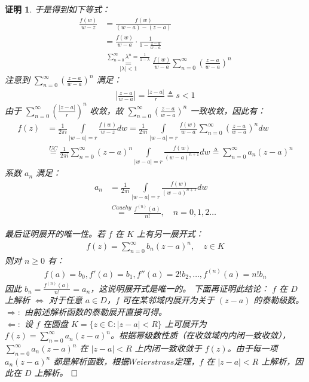 \documentclass{ctexart}
\newcommand{\。}{．} %
\newenvironment{lanse}{
    \begin{tcolorbox}[breakable,enhanced, colback=qlan, boxrule=0pt, frame hidden,
        borderline west={0.7mm}{0.1mm}{slan}]
    }
    {\end{tcolorbox}}
\theoremstyle{t} %
\newtheorem*{zmhj}{\color{slan} 证明}
\newenvironment{zm}{\begin{lanse}\begin{zmhj}}{$\hfill \square$\end{zmhj}\end{lanse}}
\begin{document}
\begin{zm}
    于是得到如下等式：
    \begin{align*}
        \frac{f(w)}{w-z}&=\frac{f(w)}{(w-a)-(z-a)}\\
        &=\frac{f(w)}{w-a}\cdot\frac{1}{1-\frac{z-a}{w-a}}\\
        &\stackrel{\sum_{n=0}^{\infty}\lambda^n=\frac{1}{1-\lambda}}{\underset{|\lambda|<1}{=}}\frac{f(w)}{w-a}\sum_{n=0}^{\infty}\left(\frac{z-a}{w-a}\right)^n
    \end{align*}
    注意到 $\sum_{n=0}^{\infty}\left(\frac{z-a}{w-a}\right)^n$ 满足：
    \begin{align*}
        \left|\frac{z-a}{w-a}\right|=\frac{|z-a|}{r}\triangleq s<1
    \end{align*}
    由于 $\sum_{n=0}^{\infty}\left(\frac{|z-a|}{r}\right)^n$ 收敛，故 $\sum_{n=0}^{\infty}\left(\frac{z-a}{w-a}\right)^n$ 一致收敛，因此有：
    \begin{align*}
        f(z)&=\frac{1}{2\pi i}\int\limits_{|w-a|=r}\frac{f(w)}{w-z}dw=\frac{1}{2\pi i}\int\limits_{|w-a|=r}\frac{f(w)}{w-a}\sum_{n=0}^{\infty}\left(\frac{z-a}{w-a}\right)^n dw\\
        &\overset{UC}{=}\frac{1}{2\pi i}\sum_{n=0}^{\infty}(z-a)^n\int\limits_{|w-a|=r}\frac{f(w)}{(w-a)^{n+1}}dw\triangleq \sum_{n=0}^{\infty}a_n(z-a)^n
    \end{align*}
    系数 $a_n$ 满足：
    \begin{align*}
        a_n&=\frac{1}{2\pi i}\int\limits_{|w-a|=r}\frac{f(w)}{(w-a)^{n+1}}dw\\
        &\overset{Cauchy}{=}\frac{f^{(n)}(a)}{n!},\quad n=0,1,2\dots
    \end{align*}
    
    最后证明展开的唯一性。若 $f$ 在 $K$ 上有另一展开式：
    \begin{align*}
        f(z)=\sum_{n=0}^{\infty}b_n(z-a)^n,\quad z\in K
    \end{align*}
    则对 $n\geq 0$ 有：
    \begin{align*}
        f(a)=b_0,f'(a)=b_1,f''(a)=2!b_2,\dots,f^{(n)}(a)=n!b_n
    \end{align*}
    因此 $b_n=\frac{f^{(n)}(a)}{n!}=a_n$，这说明展开式是唯一的。
    下面再证明此结论：
        $f$ 在 $D$ 上解析 $\Leftrightarrow$ 对于任意 $a\in D$，$f$ 可在某邻域内展开为关于 $(z-a)$ 的泰勒级数。\\
    $\Rightarrow:$ 由前述解析函数的泰勒展开直接可得。\\
    $\Leftarrow:$ 设 $f$ 在圆盘 $K=\{z\in\mathbb{C}:|z-a|<R\}$ 上可展开为 $f(z)=\sum_{n=0}^{\infty}a_n(z-a)^n$。根据幂级数性质（在收敛域内内闭一致收敛），$\sum_{n=0}^{\infty}a_n(z-a)^n$ 在 $|z-a|<R$ 上内闭一致收敛于 $f(z)$。由于每一项 $a_n(z-a)^n$ 都是解析函数，根据$Weierstrass$定理，$f$ 在 $|z-a|<R$ 上解析，因此在 $D$ 上解析。
\end{zm}
\end{document}
